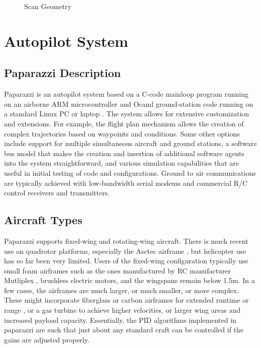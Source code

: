\documentclass[a4paper,11pt]{report}
\begin{document}
\begin{figure}[ht]
  \centering
  \caption{Scan Geometry}
  \label{fig:geometry}
\end{figure}

\section{Autopilot System}
\label{sec:paparazzi}

\subsection{Paparazzi Description}

Paparazzi is an autopilot system based on a C-code mainloop program running on an airborne ARM microcontroller and Ocaml ground-station code running on a standard Linux PC or laptop \cite{paparazzi}. The system allows for extensive customization and extensions. For example, the flight plan mechanism allows the creation of complex trajectories based on waypoints and conditions. Some other options include support for multiple simultaneous aircraft and ground stations,  a software bus model that makes the creation and insertion of additional software agents into the system straightforward, and various simulation capabilities that are useful in initial testing of code and configurations. Ground to air communications are typically achieved with low-bandwidth serial modems and commercial R/C control receivers and transmitters. 

\subsection{Aircraft Types}

Paparazzi supports fixed-wing and rotating-wing aircraft. There is much recent use on quadrotor platforms, especially the Asctec airframe \cite{asctec}, but helicopter use has so far been very limited. Users of the fixed-wing configuration typically use small foam airframes such as the ones manufactured by RC manufacturer Mutliplex \cite{multiplex}, brushless electric motors, and the wingspans remain below 1.5m. In a few cases, the airframes are much larger, or much smaller, or more complex. These might incorporate fiberglass or carbon airframes for extended runtime \cite{murat} or range \cite{corsica}, or a gas turbine to achieve higher velocities, or larger wing areas and increased payload capacity. Essentially, the PID algorithms implemented in paparazzi are such that just about any standard craft can be controlled if the gains are adjusted properly.
\end{document}
